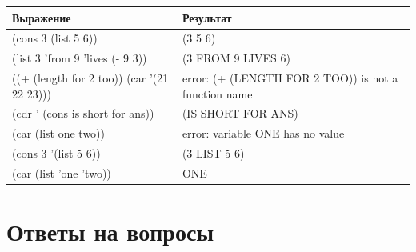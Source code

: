 \documentclass[a4paper,12pt]{article}
\begin{document}
	\begin{table} [h!]
		\begin{center}
			\begin{tabular}{|l|l|}
				\hline
				{\bf  Выражение} &    {\bf Результат} \\
				\hline
				{(cons 3 (list 5 6))} & (3 5 6)\\
				\hline
				{(list 3 'from 9 'lives (- 9 3))} & (3 FROM 9 LIVES 6)\\
				\hline
				{((+ (length for 2 too)) (car '(21 22 23)))} &error: (+ (LENGTH FOR 2 TOO)) is not a function name\\
				\hline
				{(cdr ' (cons is short for ans))} & (IS SHORT FOR ANS)\\
				\hline
				{(car (list one two))} & error: variable ONE has no value\\
				\hline
				{(cons 3 '(list 5 6))} & (3 LIST 5 6)\\
				\hline
				{(car (list 'one 'two))} & ONE\\
				\hline
			\end{tabular}  
			\label{m2}
		\end{center}
	\end{table}
	
	
	\section*{Ответы на вопросы}
	
\end{document}
